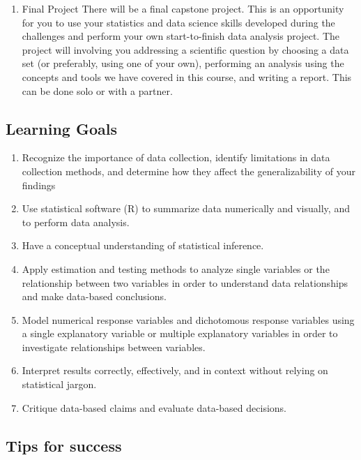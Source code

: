 \documentclass[
]{book}
\providecommand{\tightlist}{%
  \setlength{\itemsep}{0pt}\setlength{\parskip}{0pt}}
\begin{document}
\begin{enumerate}
\def\labelenumi{\arabic{enumi}.}
\setcounter{enumi}{3}
\tightlist
\item
  Final Project
  There will be a final capstone project. This is an opportunity for you to use your statistics and data science skills developed during the challenges and perform your own start-to-finish data analysis project. The project will involving you addressing a scientific question by choosing a data set (or preferably, using one of your own), performing an analysis using the concepts and tools we have covered in this course, and writing a report. This can be done solo or with a partner.
\end{enumerate}

\hypertarget{learning-goals}{%
\subsection{Learning Goals}\label{learning-goals}}

\begin{enumerate}
\def\labelenumi{\arabic{enumi}.}
\tightlist
\item
  Recognize the importance of data collection, identify limitations in data collection methods, and determine how they affect the generalizability of your findings
\item
  Use statistical software (R) to summarize data numerically and visually, and to perform data analysis.
\item
  Have a conceptual understanding of statistical inference.
\item
  Apply estimation and testing methods to analyze single variables or the relationship between two variables in order to understand data relationships and make data-based conclusions.
\item
  Model numerical response variables and dichotomous response variables using a single explanatory variable or multiple explanatory variables in order to investigate relationships between variables.
\item
  Interpret results correctly, effectively, and in context without relying on statistical jargon.
\item
  Critique data-based claims and evaluate data-based decisions.
\end{enumerate}

\hypertarget{tips-for-success}{%
\subsection{Tips for success}\label{tips-for-success}}
\end{document}
